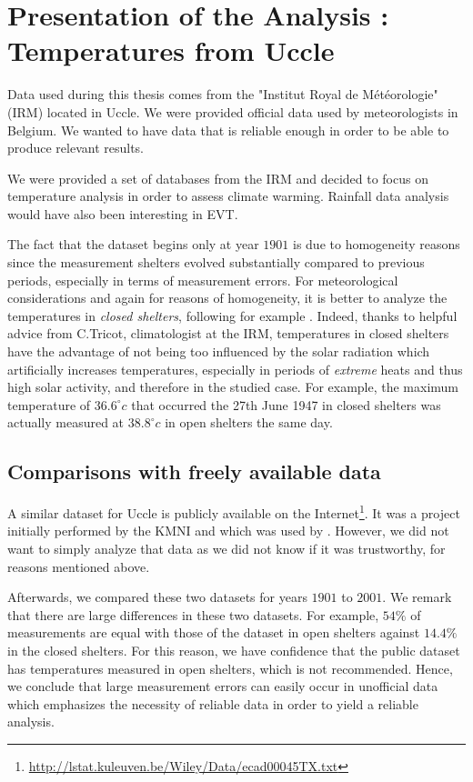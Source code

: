 \section{Presentation of the Analysis : Temperatures from Uccle}\label{sec:presuccle}

Data used during this thesis comes from the "Institut Royal de Météorologie" (IRM) located in Uccle. We were provided official data used by meteorologists in Belgium. We wanted to have data that is reliable enough in order to be able to produce relevant results. 

We were provided a set of databases from the IRM and decided to focus on temperature analysis in order to assess climate warming. Rainfall data analysis would have also been interesting in EVT. 

The fact that the dataset begins only at year $1901$ is due to homogeneity reasons since the measurement shelters evolved substantially compared to previous periods, especially in terms of measurement errors. 
For meteorological considerations and again for reasons of homogeneity, it is better to analyze the temperatures in \emph{closed shelters}, following for example \citet{lindsey_use_1956}. Indeed, thanks to helpful advice from C.Tricot, climatologist at the IRM, temperatures in closed shelters have the advantage of not being too influenced by the solar radiation which artificially increases temperatures, especially in periods of \emph{extreme} heats and thus high solar activity, and therefore in the studied case. 
For example, the maximum temperature of $36.6^{\circ}c$ that occurred the 27th June 1947 in closed shelters was actually measured at $38.8^{\circ}c$ in open shelters the same day. 



\subsection*{Comparisons with freely available data} 

A similar dataset for Uccle is publicly available on the Internet\footnote{\url{http://lstat.kuleuven.be/Wiley/Data/ecad00045TX.txt}}. It was a project initially performed by the KMNI and which was used by \citet{beirlant_statistics_2006}. However, we did not want to simply analyze that data as we did not know if it was trustworthy, for reasons mentioned above.

Afterwards, we compared these two datasets for years $1901$ to $2001$. We remark that there are large differences
in these two datasets. For example,
$54\%$ of measurements are equal with those of the dataset in open shelters against $14.4\%$ in the closed shelters. For this reason, we have confidence that the public dataset has temperatures measured in open shelters, which is not recommended. Hence, we conclude that large measurement errors can easily occur in unofficial data which emphasizes the necessity of reliable data in order to yield a reliable analysis.

